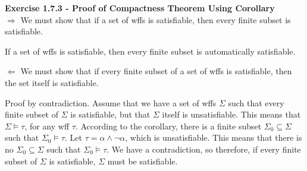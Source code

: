 \documentclass[12pt]{article}	%
\begin{document}
\begin{flushleft}
\textbf{Exercise 1.7.3 - Proof of Compactness Theorem Using Corollary} \\
$\Rightarrow$ We must show that if a set of wffs is satisfiable, then every finite subset is satisfiable. \\

\vspace{2mm}

If a set of wffs is satisfiable, then every finite subset is automatically satisfiable. \\

\vspace{5mm}

$\Leftarrow$ We must show that if every finite subset of a set of wffs is satisfiable, then the set itself is satisfiable. \\

\vspace{2mm}

Proof by contradiction. Assume that we have a set of wffs $\Sigma$ such that every finite subset of $\Sigma$ is satisfiable, but that $\Sigma$ itself is unsatisfiable. This means that $\Sigma \models \tau$, for any wff $\tau$. According to the corollary, there is a finite subset $\Sigma_0 \subseteq \Sigma$ such that $\Sigma_0 \models \tau$. Let $\tau = \alpha \wedge \neg\alpha$, which is unsatisfiable. This means that there is no $\Sigma_0 \subseteq \Sigma$ such that $\Sigma_0 \models \tau$. We have a contradiction, so therefore, if every finite subset of $\Sigma$ is satisfiable, $\Sigma$ must be satisfiable.

\end{flushleft}
%
%
\end{document}
